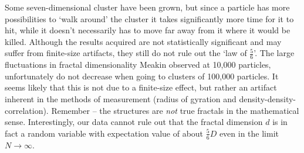 \documentclass[twocolumn,10pt]{scrartcl}
\begin{document}
                Some seven-dimensional cluster have been grown, but since a particle has more possibilities to `walk
                around' the cluster it takes significantly more time for it to hit, while it doesn't necessarily has to
                move far away from it where it would be killed. Although the results acquired are not statistically
                significant and may suffer from finite-size artifacts, they still do not rule out the `law of $\frac{5}{6}$'.
                The large fluctuations in fractal dimensionality Meakin observed at 10,000 particles, unfortunately
                do not decrease when going to clusters of 100,000 particles. It seems likely that this is not due to
                a finite-size effect, but rather an artifact inherent in the methods of measurement (radius of gyration
                and density-density-correlation). Remember -- the structures are \emph{not} true fractals in the
                mathematical sense. Interestingly, our data cannot rule out that the fractal dimension $d$ is in fact
                a random variable with expectation value of about $\frac{5}{6}D$ even in the limit
                $N\rightarrow\infty$.
\end{document}
